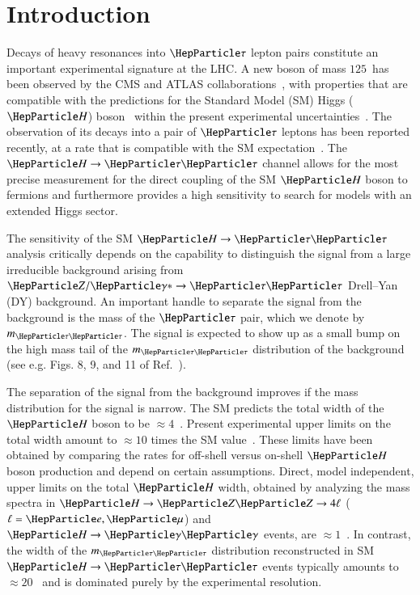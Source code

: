 \section{Introduction}
\label{sec:introduction}

Decays of heavy resonances into $\Pgt$ lepton pairs constitute an important experimental signature at the LHC.
A new boson of mass $125$~\GeV has been observed by the CMS and ATLAS collaborations~\cite{Higgs-Discovery_CMS,Higgs-Discovery_ATLAS},
with properties that are compatible with the predictions for the Standard Model (SM) 
Higgs ($\PHiggs$) boson~\cite{Englert:1964et,Higgs:1964ia,Higgs:1964pj,Guralnik:1964eu,Higgs:1966ev,Kibble:1967sv}
within the present experimental uncertainties~\cite{HIG-14-014,Chatrchyan:2014tja,Khachatryan:2014iha,HIG-14-009}.
The observation of its decays into a pair of $\Pgt$ leptons has been reported recently, at a rate that is compatible with the SM expectation~\cite{HIG-15-002}.
The $\PHiggs \to \Pgt\Pgt$ channel allows for the most precise measurement for the direct coupling of the SM $\PHiggs$ boson to fermions
and furthermore provides a high sensitivity to search for models with an extended Higgs sector.

The sensitivity of the SM $\PHiggs \to \Pgt\Pgt$ analysis critically depends on
the capability to distinguish the signal from a large irreducible background arising from $\PZ/\Pggx \to \Pgt\Pgt$ Drell--Yan (DY) background.
An important handle to separate the signal from the background is the mass of the $\Pgt$ pair, which we denote by $m_{\Pgt\Pgt}$.
The signal is expected to show up as a small bump on the high mass tail of the $m_{\Pgt\Pgt}$ distribution of the background
(see e.g. Figs. 8, 9, and 11 of Ref.~\cite{HIG-13-004}).

The separation of the signal from the background improves if the mass distribution for the signal is narrow.
The SM predicts the total width of the $\PHiggs$ boson to be $\approx 4$~\MeV.
Present experimental upper limits on the total width amount to $\approx 10$ times the SM value~\cite{HIG-14-002,Aad:2015xua}.
These limits have been obtained by comparing the rates for off-shell versus on-shell $\PHiggs$ boson production and depend on certain assumptions.
Direct, model independent, upper limits on the total $\PHiggs$ width, 
obtained by analyzing the mass spectra in $\PHiggs \to \PZ\PZ \to 4 \Plepton$ ($\Plepton = \Pe, \Pgm$) and $\PHiggs \to \Pgamma\Pgamma$ events, are $\approx 1$~\GeV.
In contrast, the width of the $m_{\Pgt\Pgt}$ distribution reconstructed in SM $\PHiggs \to \Pgt\Pgt$ events typically amounts to $\approx 20$~\GeV 
and is dominated purely by the experimental resolution.

